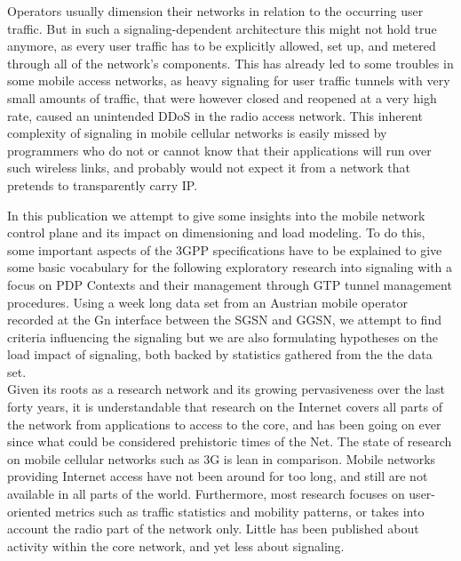 Operators usually dimension their networks in relation to the occurring user traffic. But in such a signaling-dependent architecture this might not hold true anymore, as every user traffic has to be explicitly allowed, set up, and metered through all of the network's components. This has already led to some troubles in some mobile access networks, as heavy signaling for user traffic tunnels with very small amounts of traffic, that were however closed and reopened at a very high rate, caused an unintended \gls{DDoS} in the radio access network\cite{lt2012docostorm, it2011birdandroid}. 
This inherent complexity of signaling in mobile cellular networks is easily missed by programmers who do not or cannot know that their applications will run over such wireless links, and probably would not expect it from a network that pretends to transparently carry IP.

In this publication we attempt to give some insights into the mobile network control plane and its impact on dimensioning and load modeling. To do this, some important aspects of the \gls{3GPP} specifications have to be explained to give some basic vocabulary for the following exploratory research into signaling with a focus on \gls{PDP} Contexts and their management through \gls{GTP} tunnel management procedures. Using a week long data set from an Austrian mobile operator recorded at the Gn interface between the \gls{SGSN} and \gls{GGSN}, we attempt to find criteria influencing the signaling but we are also formulating hypotheses on the load impact of signaling, both backed by statistics gathered from the the data set.\\




Given its roots as a research network and its growing pervasiveness over the last forty years, it is understandable that research on the Internet covers all parts of the network from applications to access to the core, and has been going on ever since what could be considered prehistoric times of the Net. The state of research on mobile cellular networks such as 3G is lean in comparison. Mobile networks providing Internet access have not been around for too long, and still are not available in all parts of the world. Furthermore, most research focuses on user-oriented metrics such as traffic statistics and mobility patterns, or takes into account the radio part of the network only. Little has been published about activity within the core network, and yet less about signaling.

